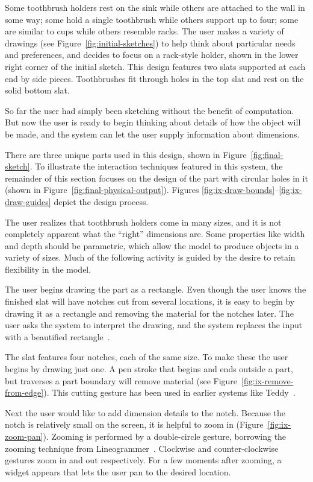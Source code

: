 \documentclass[11pt]{article}
\begin{document}
Some toothbrush holders rest on the sink while others are attached to
the wall in some way; some hold a single toothbrush while others
support up to four; some are similar to cups while others resemble
racks. The user makes a variety of drawings (see
Figure~\ref{fig:initial-sketches}) to help think about particular
needs and preferences, and decides to focus on a rack-style holder,
shown in the lower right corner of the initial sketch. This design
features two slats supported at each end by side pieces. Toothbrushes
fit through holes in the top slat and rest on the solid bottom slat.

So far the user had simply been sketching without the benefit of
computation. But now the user is ready to begin thinking about details
of how the object will be made, and the system can let the user supply
information about dimensions.

There are three unique parts used in this design, shown in
Figure~\ref{fig:final-sketch}. To illustrate the interaction
techniques featured in this system, the remainder of this section
focuses on the design of the part with circular holes in it (shown in
Figure~\ref{fig:final-physical-output}). Figures
\ref{fig:ix-draw-bounds}--\ref{fig:ix-draw-guides} depict the design
process.

The user realizes that toothbrush holders come in many sizes, and it
is not completely apparent what the ``right'' dimensions are. Some
properties like width and depth should be parametric, which allow the
model to produce objects in a variety of sizes. Much of the following
activity is guided by the desire to retain flexibility in the model.

The user begins drawing the part as a rectangle. Even though the user
knows the finished slat will have notches cut from several locations,
it is easy to begin by drawing it as a rectangle and removing the
material for the notches later. The user asks the system to interpret
the drawing, and the system replaces the input with a beautified
rectangle~\cite{pavlidis-beautifier}.

The slat features four notches, each of the same size. To make these
the user begins by drawing just one. A pen stroke that begins and ends
outside a part, but traverses a part boundary will remove material
(see Figure~\ref{fig:ix-remove-from-edge}). This cutting gesture has
been used in earlier systems like Teddy~\cite{igarashi-teddy}.

Next the user would like to add dimension details to the
notch. Because the notch is relatively small on the screen, it is
helpful to zoom in (Figure~\ref{fig:ix-zoom-pan}). Zooming is
performed by a double-circle gesture, borrowing the zooming
technique from Lineogrammer~\cite{zeleznik-lineogrammer}. Clockwise
and counter-clockwise gestures zoom in and out respectively. For a few
moments after zooming, a widget appears that lets the user pan to the
desired location.
\end{document}
